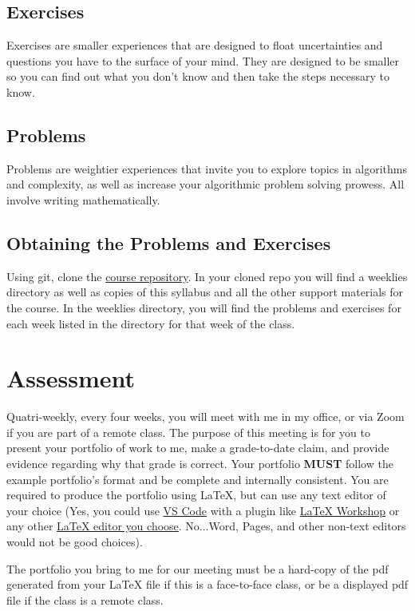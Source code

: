 \documentclass[12pt]{amsart}
\begin{document}
\subsection{Exercises} Exercises are smaller experiences that are designed to float uncertainties and questions you have to the surface of your mind. They are designed to be smaller so you can find out what you don't know and then take the steps necessary to know.
\subsection{Problems} Problems are weightier experiences that invite you to explore topics in algorithms and complexity, as well as increase your algorithmic problem solving prowess. All involve writing mathematically.
\subsection{Obtaining the Problems and Exercises} Using git, clone the \href{https://github.com/byui-cse/cse381-course}{course repository}. In your cloned repo you will find a weeklies directory as well as copies of this syllabus and all the other support materials for the course. In the weeklies directory, you will find the problems and exercises for each week listed in the directory for that week of the class.

\section{Assessment} Quatri-weekly, every four weeks, you will meet with me in my office, or via Zoom if you are part of a remote class. The purpose of this meeting is for you to present your portfolio of work to me, make a grade-to-date claim, and provide evidence regarding why that grade is correct. Your portfolio \textbf{MUST} follow the example portfolio's format and be complete and internally consistent. You are required to produce the portfolio using \LaTeX, but can use any text editor of your choice (Yes, you could use \href{https://code.visualstudio.com/download}{VS Code}  with a plugin like \href{https://marketplace.visualstudio.com/items?itemName=James-Yu.latex-workshop}{\LaTeX{} Workshop}  or any other \href{https://www.google.com/search?q=Best LaTex Editor}{\LaTeX{}  editor you choose}. No$\ldots$Word, Pages, and other non-text editors would not be good choices).

The portfolio you bring to me for our meeting must be a hard-copy of the pdf generated from your \LaTeX{} file if this is a face-to-face class, or be a displayed pdf file if the class is a remote class.
\end{document}
